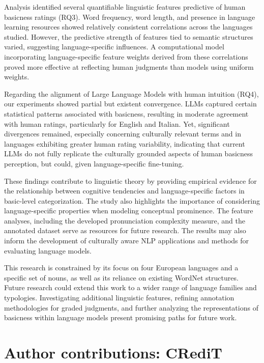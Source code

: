 \documentclass[preprint,12pt,authoryear]{elsarticle}
\begin{document}
Analysis identified several quantifiable linguistic features predictive of human basicness ratings (RQ3). Word frequency, word length, and presence in language learning resources showed relatively consistent correlations across the languages studied. However, the predictive strength of features tied to semantic structures varied, suggesting language-specific influences. A computational model incorporating language-specific feature weights derived from these correlations proved more effective at reflecting human judgments than models using uniform weights.

Regarding the alignment of Large Language Models with human intuition (RQ4), our experiments showed partial but existent convergence. LLMs captured certain statistical patterns associated with basicness, resulting in moderate agreement with human ratings, particularly for English and Italian. Yet, significant divergences remained, especially concerning culturally relevant terms and in languages exhibiting greater human rating variability, indicating that current LLMs do not fully replicate the culturally grounded aspects of human basicness perception, but could, given language-specific fine-tuning.

These findings contribute to linguistic theory by providing empirical evidence for the relationship between cognitive tendencies and language-specific factors in basic-level categorization. The study also highlights the importance of considering language-specific properties when modeling conceptual prominence. The feature analyses, including the developed pronunciation complexity measure, and the annotated dataset serve as resources for future research. The results may also inform the development of culturally aware NLP applications and methods for evaluating language models.

This research is constrained by its focus on four European languages and a specific set of nouns, as well as its reliance on existing WordNet structures. Future research could extend this work to a wider range of language families and typologies. Investigating additional linguistic features, refining annotation methodologies for graded judgments, and further analyzing the representations of basicness within language models present promising paths for future work.

\section{Author contributions: CRediT}
\end{document}

